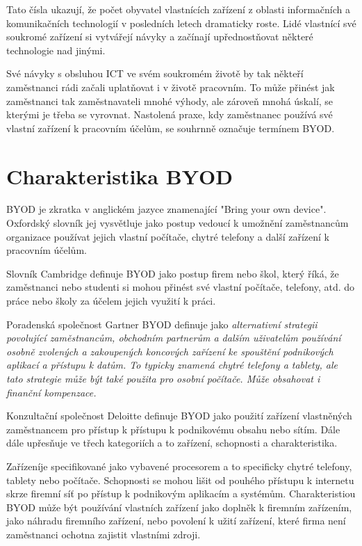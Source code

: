 Tato čísla ukazují, že počet obyvatel vlastnících zařízení z oblasti informačních a komunikačních technologií v posledních letech dramaticky roste. Lidé vlastnící své soukromé zařízení si vytvářejí návyky a začínají upřednostňovat některé technologie nad jinými.

Své návyky s obsluhou ICT ve svém soukromém životě by tak někteří zaměstnanci rádi začali uplatňovat i v životě pracovním. To může přinést jak zaměstnanci tak zaměstnavateli mnohé výhody, ale zároveň mnohá úskalí, se kterými je třeba se vyrovnat. Nastolená praxe, kdy zaměstnanec používá své vlastní zařízení k pracovním účelům, se souhrnně označuje termínem BYOD.



\section{Charakteristika BYOD}

BYOD je zkratka v anglickém jazyce znamenající "Bring your own device". Oxfordský slovník jej vysvětluje jako postup vedoucí k umožnění zaměstnancům organizace používat jejich vlastní počítače, chytré telefony a další zařízení k pracovním účelům.  

Slovník Cambridge definuje BYOD jako postup firem nebo škol, který říká, že zaměstnanci nebo studenti si mohou přinést své vlastní počítače, telefony, atd.  do práce nebo školy za účelem jejich využití k práci. 

Poradenská společnost Gartner BYOD definuje jako \textit{alternativní strategii povolující zaměstnancům, obchodním partnerům a dalším uživatelům používání osobně zvolených a zakoupených koncových zařízení ke spouštění podnikových aplikací a přístupu k datům. To typicky znamená chytré telefony a tablety, ale tato strategie může být také použita pro osobní počítače. Může obsahovat i finanční kompenzace.}

Konzultační společnost Deloitte definuje BYOD jako použití zařízení vlastněných zaměstnancem pro přístup k přístupu k podnikovému obsahu nebo sítím.  Dále dále upřesňuje ve třech kategoriích a to zařízení, schopnosti a charakteristika. 

Zařízeníje specifikované jako vybavené procesorem a to specificky chytré telefony, tablety nebo počítače. Schopnosti se mohou lišit od pouhého přístupu k internetu skrze firemní síť po přístup k podnikovým aplikacím a systémům. Charakteristiou BYOD může být používání vlastních zařízení jako doplněk k firemním zařízením, jako náhradu firemního zařízení, nebo povolení k užití zařízení, které firma není zaměstnanci ochotna zajistit vlastními zdroji. 

